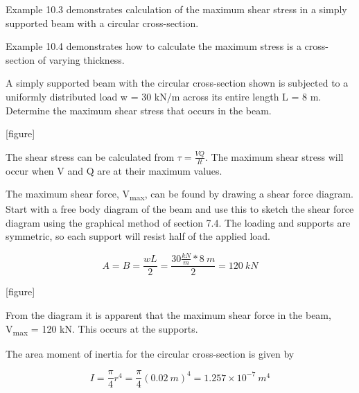 \documentclass[
  letterpaper,
  DIV=11,
  numbers=noendperiod]{scrreprt}
\begin{document}
Example 10.3 demonstrates calculation of the maximum shear stress in a
simply supported beam with a circular cross-section.

Example 10.4 demonstrates how to calculate the maximum stress is a
cross-section of varying thickness.

\begin{tcolorbox}[enhanced jigsaw, breakable, opacityback=0, toptitle=1mm, left=2mm, colback=white, opacitybacktitle=0.6, colframe=quarto-callout-tip-color-frame, titlerule=0mm, arc=.35mm, leftrule=.75mm, bottomtitle=1mm, colbacktitle=quarto-callout-tip-color!10!white, rightrule=.15mm, title={Example 10.3}, bottomrule=.15mm, toprule=.15mm, coltitle=black]

A simply supported beam with the circular cross-section shown is
subjected to a uniformly distributed load w = 30 kN/m across its entire
length L = 8 m. Determine the maximum shear stress that occurs in the
beam.

{[}figure{]}

\begin{tcolorbox}[enhanced jigsaw, breakable, opacityback=0, toptitle=1mm, left=2mm, colback=white, opacitybacktitle=0.6, colframe=quarto-callout-tip-color-frame, titlerule=0mm, arc=.35mm, leftrule=.75mm, bottomtitle=1mm, colbacktitle=quarto-callout-tip-color!10!white, rightrule=.15mm, title={Solution}, bottomrule=.15mm, toprule=.15mm, coltitle=black]

The shear stress can be calculated from \(\tau=\frac{V Q}{I t}\). The
maximum shear stress will occur when V and Q are at their maximum
values.

The maximum shear force, V\textsubscript{max}, can be found by drawing a
shear force diagram. Start with a free body diagram of the beam and use
this to sketch the shear force diagram using the graphical method of
section 7.4. The loading and supports are symmetric, so each support
will resist half of the applied load.

\[
A=B=\frac{w L}{2}=\frac{30\frac{kN}{m} * 8{~m}}{2}=120{~kN}
\]

{[}figure{]}

From the diagram it is apparent that the maximum shear force in the
beam, V\textsubscript{max} = 120 kN. This occurs at the supports.

The area moment of inertia for the circular cross-section is given by

\[
I=\frac{\pi}{4} r^4=\frac{\pi}{4}(0.02{~m})^4=1.257 \times 10^{-7}{~m}^4
\]


\end{tcolorbox}
\end{tcolorbox}
\end{document}
